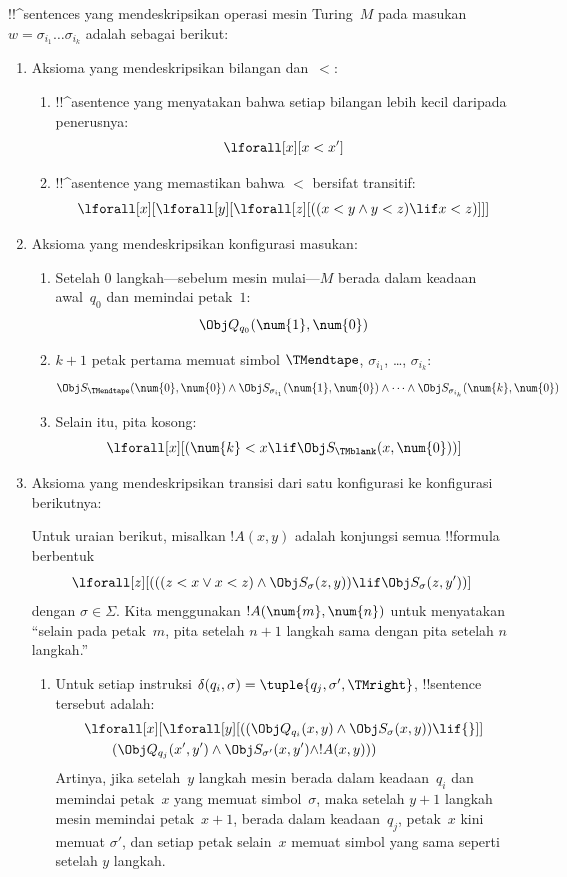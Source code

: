 \documentclass[../../../include/open-logic-section]{subfiles}
\begin{document}
!!^{sentence}s yang mendeskripsikan operasi mesin Turing~$M$ pada masukan
$w = \sigma_{i_1}\dots\sigma_{i_k}$ adalah sebagai berikut:
\begin{enumerate}
\item Aksioma yang mendeskripsikan bilangan dan~$<$:
\begin{enumerate}
\item !!^a{sentence} yang menyatakan bahwa setiap bilangan lebih kecil daripada
penerusnya:
\[
\lforall[x][x < x']
\]
\item !!^a{sentence} yang memastikan bahwa $<$ bersifat transitif:
\[
\lforall[x][\lforall[y][\lforall[z][
      ((x < y \land y < z) \lif x < z)]]]
\]
\end{enumerate}
\item Aksioma yang mendeskripsikan konfigurasi masukan:
\begin{enumerate}
\item Setelah $0$ langkah---sebelum mesin mulai---$M$ berada dalam keadaan
  awal~$q_0$ dan memindai petak~$1$:
\[
\Obj Q_{q_0}(\num{1}, \num{0})
\]
\item $k+1$ petak pertama memuat simbol $\TMendtape$,
  $\sigma_{i_1}$, \dots, $\sigma_{i_k}$:
\[
\Obj S_\TMendtape(\num{0}, \num{0}) \land
\Obj S_{\sigma_{i_1}}(\num{1}, \num{0}) \land
\dots \land
\Obj S_{\sigma_{i_k}}(\num{k}, \num{0})
\]
\item Selain itu, pita kosong:
\[
\lforall[x][(\num{k} < x \lif \Obj S_\TMblank(x, \num{0}))]
\]
\end{enumerate}
\item Aksioma yang mendeskripsikan transisi dari satu konfigurasi ke
  konfigurasi berikutnya:

Untuk uraian berikut, misalkan $!A(x, y)$ adalah konjungsi semua !!{formula}
berbentuk
\[
\lforall[z][
  (((z < x \lor x < z) \land \Obj S_\sigma(z, y))
  \lif \Obj S_\sigma(z, y'))]
\]
dengan $\sigma \in \Sigma$. Kita menggunakan $!A(\num{m},\num{n})$ untuk
menyatakan ``selain pada petak~$m$, pita setelah $n+1$ langkah sama dengan pita
setelah $n$ langkah.''
\begin{enumerate}
\item {} Untuk setiap instruksi $\delta(q_i, \sigma) =
  \tuple{q_j, \sigma', \TMright}$, !!{sentence} tersebut adalah:
\begin{align*}
& \lforall[x][\lforall[y][(
   (\Obj Q_{q_i}(x, y) \land \Obj S_{\sigma}(x, y)) \lif {}]] \\
&\qquad   (\Obj Q_{q_j}(x', y') \land \Obj S_{\sigma'}(x, y') \land
!A(x, y)))
\end{align*}
Artinya, jika setelah~$y$ langkah mesin berada dalam keadaan~$q_i$ dan
memindai petak~$x$ yang memuat simbol~$\sigma$, maka setelah $y+1$ langkah
mesin memindai petak~$x+1$, berada dalam keadaan~$q_j$, petak~$x$ kini memuat
$\sigma'$, dan setiap petak selain~$x$ memuat simbol yang sama seperti setelah
$y$ langkah.


\end{enumerate}
\end{enumerate}
\end{document}

